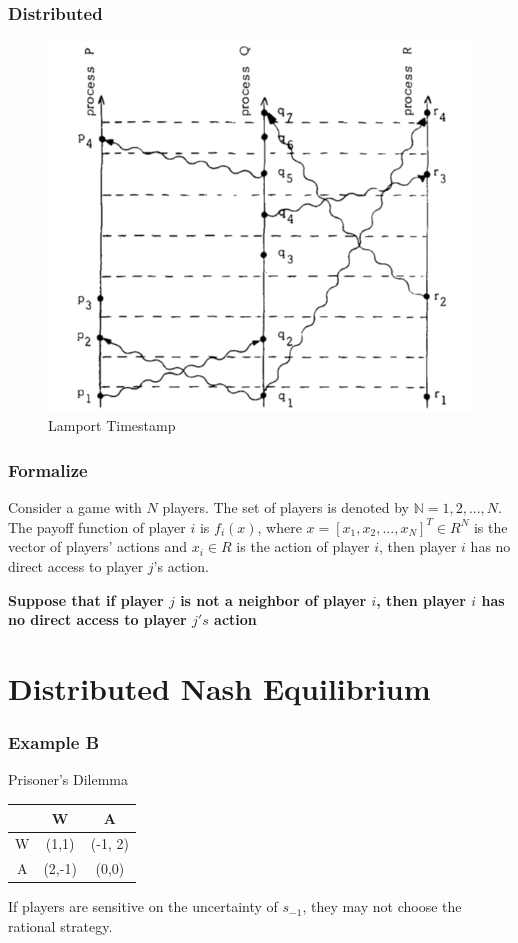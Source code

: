 \documentclass[notheorems, aspectratio=54]{beamer}
\begin{document}
\begin{frame}
  \frametitle{Distributed}
  \begin{figure}[H]
    \centering
    \includegraphics[width=0.5\linewidth]{lamportts.png}
    \caption{Lamport Timestamp}
  \end{figure}
\end{frame}


\begin{frame}
  \frametitle{Formalize}
  Consider a game with $N$ players.
  The set of players is denoted by $\mathbb{N}={1, 2, ..., N}$.
  The payoff function of player $i$ is $f_i(x)$,
  where $x = [x_1, x_2,...,x_N]^T \in R^N$ is the vector of players' actions
  and $x_i \in R$ is the action of player $i$,
  then player $i$ has no direct access to player $j$'s action.\newline

  \bfseries{Suppose that if player $j$ is not a neighbor of player $i$, then player $i$ has no direct access to player $j's$ action}
\end{frame}





\section {Distributed Nash Equilibrium}
\begin{frame}
  \frametitle{Example B}

  Prisoner's Dilemma
  \begin{center}
    \begin{tabular}{c|c|c|}
      & W & A \\
      \hline
      W & (1,1)&(-1, 2)\\
      \hline
      A & (2,-1)&(0,0)\\
    \end{tabular}
  \end{center}
  If players are sensitive on the uncertainty of $s_{-1}$, they may not choose the rational strategy.
\end{frame}
\end{document}
